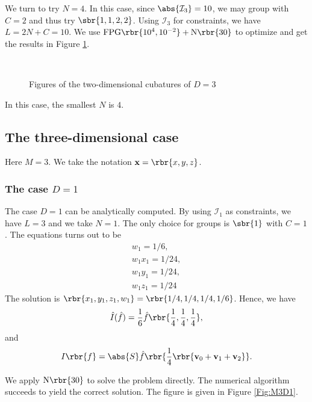 \documentclass[english, nochinese]{pnote}
\begin{document}
We turn to try $ N = 4 $. In this case, since $ \abs{\mathcal{I}_3} = 10 $, we may group with $ C = 2 $ and thus try $ \sbr{ 1, 1, 2, 2 } $. Using $\mathcal{I}_3$ for constraints, we have $ L = 2 N + C = 10 $. We use $ \text{FPG} \rbr{ 10^4, 10^{-2} } + \text{N} \rbr{30} $ to optimize and get the results in Figure \ref{Fig:M2D3}.

\begin{figure}[htbp]
\centering
\scalebox{0.75}{}~
\scalebox{0.75}{}
\caption{Figures of the two-dimensional cubatures of $ D = 3 $}
\label{Fig:M2D3}
\end{figure}

In this case, the smallest $N$ is $4$.

\subsection{The three-dimensional case}

Here $ M = 3 $. We take the notation $ \mathbf{x} = \rbr{ x, y, z } $.

\subsubsection{The case $ D = 1 $}

The case $ D = 1 $ can be analytically computed. By using $\mathcal{I}_1$ as constraints, we have $ L = 3 $ and we take $ N = 1 $. The only choice for groups is $\sbr{1}$ with $ C = 1 $. The equations turns out to be
\begin{gather}
w_1 = 1 / 6, \\
w_1 x_1 = 1 / 24, \\
w_1 y_1 = 1 / 24, \\
w_1 z_1 = 1 / 24
\end{gather}
The solution is $ \rbr{ x_1, y_1, z_1, w_1 } = \rbr{ 1 / 4, 1 / 4, 1 / 4, 1 / 6 } $. Hence, we have
\begin{equation}
\hat{I} (\hat{f}) = \frac{1}{6} \hat{f} \rbr{ \frac{1}{4}, \frac{1}{4}, \frac{1}{4} },
\end{equation}
and
\begin{equation}
I \rbr{f} = \abs{S} \hat{f} \rbr{ \frac{1}{4} \rbr{ \mathbf{v}_0 + \mathbf{v}_1 + \mathbf{v}_2 } }.
\end{equation}

We apply $ \text{N} \rbr{30} $ to solve the problem directly. The numerical algorithm succeeds to yield the correct solution. The figure is given in Figure \ref{Fig:M3D1}.
\end{document}
